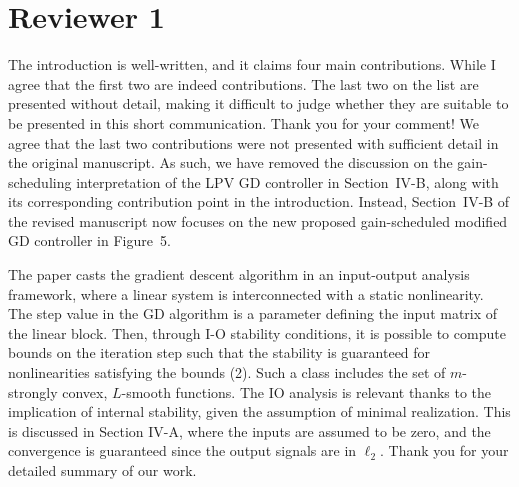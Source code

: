 \section*{Reviewer 1}\label{sec:reviewer1}
\renewcommand{\theequation}{R1.\arabic{equation}}
\setcounter{equation}{0}
\begin{rebuttal}[resolved]
    {%
        The introduction is well-written, and it claims four main contributions. While I agree that the first two are indeed contributions. The last two on the list are presented without detail, making it difficult to judge whether they are suitable to be presented in this short communication.
    }%
    {%
        Thank you for your comment! We agree that the last two contributions were not presented with sufficient detail in the original manuscript. As such, we have removed the discussion on the gain-scheduling interpretation of the LPV GD controller in Section~IV-B, along with its corresponding contribution point in the introduction. Instead, Section~IV-B of the revised manuscript now focuses on the new proposed gain-scheduled modified GD controller in Figure~5.
    }%
\end{rebuttal}
\begin{rebuttal}[resolved]
    {%
        The paper casts the gradient descent algorithm in an input-output analysis framework, where a linear system is interconnected with a static nonlinearity. The step value in the GD algorithm is a parameter defining the input matrix of the linear block. Then, through I-O stability conditions, it is possible to compute bounds on the iteration step such that the stability is guaranteed for nonlinearities satisfying the bounds (2). Such a class includes the set of $m$-strongly convex, $L$-smooth functions. The IO analysis is relevant thanks to the implication of internal stability, given the assumption of minimal realization. This is discussed in Section IV-A, where the inputs are assumed to be zero, and the convergence is guaranteed since the output signals are in \(\ell_2\).
    }%
    {%
        Thank you for your detailed summary of our work.
    }%
\end{rebuttal}
